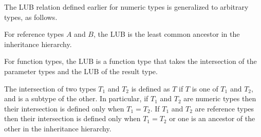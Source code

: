 The LUB relation defined earlier for numeric types is generalized to
arbitrary types, as follows.

For reference types $A$ and $B$, the LUB is the least common ancestor
in the inheritance hierarchy.

For function types, the LUB is a function type that takes the
intersection of the parameter types and the LUB of the
result type.

The intersection of two types $T_1$ and $T_2$ is defined as $T$ if $T$
is one of
$T_1$ and $T_2$, and is a subtype of the other. In particular, if
$T_1$ and $T_2$ are numeric types then their intersection is defined
only when $T_1 = T_2$. If
$T_1$ and $T_2$ are reference types then their intersection is defined
only when $T_1 = T_2$ or one is an ancestor of the other in the
inheritance hierarchy.


%
%
%
